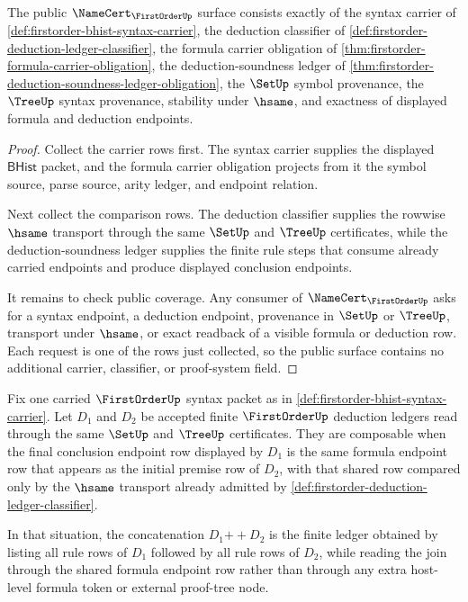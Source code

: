 \begin{theorem}\label{thm:firstorder-namecert-obligation-surface}
The public $\NameCert_{\FirstOrderUp}$ surface consists exactly of the syntax
carrier of \autoref{def:firstorder-bhist-syntax-carrier}, the deduction
classifier of \autoref{def:firstorder-deduction-ledger-classifier}, the
formula carrier obligation of
\autoref{thm:firstorder-formula-carrier-obligation}, the deduction-soundness
ledger of \autoref{thm:firstorder-deduction-soundness-ledger-obligation}, the
$\SetUp$ symbol provenance, the $\TreeUp$ syntax provenance, stability under
$\hsame$, and exactness of displayed formula and deduction endpoints.
\end{theorem}
\begin{proof}
Collect the carrier rows first. The syntax carrier supplies the displayed
$\mathsf{BHist}$ packet, and the formula carrier obligation projects from it
the symbol source, parse source, arity ledger, and endpoint relation.

Next collect the comparison rows. The deduction classifier supplies the
rowwise $\hsame$ transport through the same $\SetUp$ and $\TreeUp$
certificates, while the deduction-soundness ledger supplies the finite rule
steps that consume already carried endpoints and produce displayed conclusion
endpoints.

It remains to check public coverage. Any consumer of $\NameCert_{\FirstOrderUp}$
asks for a syntax endpoint, a deduction endpoint, provenance in $\SetUp$ or
$\TreeUp$, transport under $\hsame$, or exact readback of a visible formula or
deduction row. Each request is one of the rows just collected, so the public
surface contains no additional carrier, classifier, or proof-system field.
\end{proof}

\begin{definition}\label{def:firstorder-deduction-ledger-concatenation-source}
Fix one carried $\FirstOrderUp$ syntax packet as in \autoref{def:firstorder-bhist-syntax-carrier}. Let $D_1$ and $D_2$ be accepted finite $\FirstOrderUp$ deduction ledgers read through the same $\SetUp$ and $\TreeUp$ certificates. They are composable when the final conclusion endpoint row displayed by $D_1$ is the same formula endpoint row that appears as the initial premise row of $D_2$, with that shared row compared only by the $\hsame$ transport already admitted by \autoref{def:firstorder-deduction-ledger-classifier}.

In that situation, the concatenation $D_1 \mathbin{+\!\!+} D_2$ is the finite ledger obtained by listing all rule rows of $D_1$ followed by all rule rows of $D_2$, while reading the join through the shared formula endpoint row rather than through any extra host-level formula token or external proof-tree node.
\end{definition}

